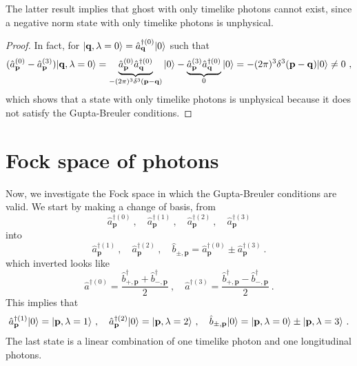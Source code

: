     The latter result implies that ghost with only timelike photons cannot exist, since a negative norm state with only timelike photons is unphysical. 
    \begin{proof}
        In fact, for $\vert\mathbf q, \lambda = 0\rangle = \hat a^{\dagger (0)}_{\mathbf q} \vert0\rangle$ such that 
        \begin{equation*}
            (\hat a^{(0)}_{\mathbf p} - \hat a^{(3)}_{\mathbf p}) \vert\mathbf q, \lambda = 0\rangle = \underbrace{\hat a^{(0)}_{\mathbf p} \hat a^{\dagger (0)}_{\mathbf q}}_{- (2\pi)^3 \delta^3 (\mathbf p - \mathbf q)} \vert0\rangle - \underbrace{\hat a^{(3)}_{\mathbf p} \hat a^{\dagger (0)}_{\mathbf q}}_0 \vert0\rangle = - (2\pi)^3 \delta^3 (\mathbf p - \mathbf q) \vert0\rangle \neq 0 ~,
        \end{equation*}
        which shows that a state with only timelike photons is unphysical because it does not satisfy the Gupta-Breuler conditions. 
    \end{proof} 

\section{Fock space of photons}

    Now, we investigate the Fock space in which the Gupta-Breuler conditions are valid. We start by making a change of basis, from 
    \begin{equation*}
        \hat a^{\dagger(0)}_{\mathbf p} ~, \quad \hat a^{\dagger(1)}_{\mathbf p} ~, \quad \hat a^{\dagger(2)}_{\mathbf p} ~, \quad \hat a^{\dagger(3)}_{\mathbf p} 
    \end{equation*}
    into 
    \begin{equation*}
        \hat a^{\dagger(1)}_{\mathbf p} ~, \quad \hat a^{\dagger(2)}_{\mathbf p} ~, \quad \hat b_{\pm, \mathbf p} = \hat a^{\dagger(0)}_{\mathbf p} \pm \hat a^{\dagger(3)}_{\mathbf p} ~.
    \end{equation*}
    which inverted looks like 
    \begin{equation*}
        \hat a^{\dagger (0)} = \frac{\hat b^\dagger_{+, \mathbf p} + \hat b^\dagger_{-, \mathbf p} }{2} ~, \quad \hat a^{\dagger (3)} = \frac{\hat b^\dagger_{+, \mathbf p} - \hat b^\dagger_{-, \mathbf p} }{2}  ~.
    \end{equation*}
    This implies that 
    \begin{equation*}
        \hat a^{\dagger(1)}_{\mathbf p} \vert0\rangle = \vert\mathbf p, \lambda = 1\rangle ~, \quad \hat a^{\dagger(2)}_{\mathbf p} \vert0\rangle = \vert\mathbf p, \lambda = 2\rangle ~, \quad \hat b_{\pm, \mathbf p} \vert0\rangle = \vert\mathbf p, \lambda = 0\rangle \pm \vert\mathbf p, \lambda = 3\rangle ~.
    \end{equation*}
    The last state is a linear combination of one timelike photon and one longitudinal photons.

